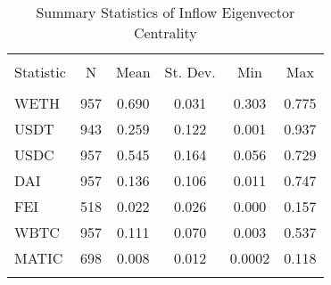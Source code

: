 
\begin{table}[!htbp] \centering 
  \caption{Summary Statistics of Inflow Eigenvector Centrality} 
  \label{} 
\begin{tabular}{@{\extracolsep{5pt}}lccccc} 
\\[-1.8ex]\hline 
\hline \\[-1.8ex] 
Statistic & \multicolumn{1}{c}{N} & \multicolumn{1}{c}{Mean} & \multicolumn{1}{c}{St. Dev.} & \multicolumn{1}{c}{Min} & \multicolumn{1}{c}{Max} \\ 
\hline \\[-1.8ex] 
WETH & 957 & 0.690 & 0.031 & 0.303 & 0.775 \\ 
USDT & 943 & 0.259 & 0.122 & 0.001 & 0.937 \\ 
USDC & 957 & 0.545 & 0.164 & 0.056 & 0.729 \\ 
DAI & 957 & 0.136 & 0.106 & 0.011 & 0.747 \\ 
FEI & 518 & 0.022 & 0.026 & 0.000 & 0.157 \\ 
WBTC & 957 & 0.111 & 0.070 & 0.003 & 0.537 \\ 
MATIC & 698 & 0.008 & 0.012 & 0.0002 & 0.118 \\ 
\hline \\[-1.8ex] 
\end{tabular} 
\end{table} 
